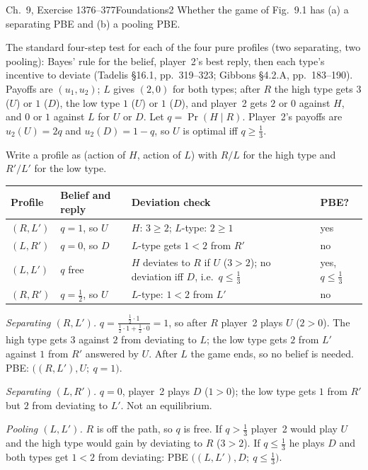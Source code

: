 \begin{exsol}{\MG{} Ch.~9, Exercise 1}{376--377}{Foundations}{2}
\asked Whether the game of Fig.~9.1 has (a) a separating PBE and (b) a pooling PBE.

\method The standard four-step test for each of the four pure profiles (two separating, two
pooling): Bayes' rule for the belief, player~2's best reply, then each type's incentive to deviate
(Tadelis \S16.1, pp.~319--323; Gibbons \S4.2.A, pp.~183--190). Payoffs are $(u_1, u_2)$; $L$ gives
$(2, 0)$ for both types; after $R$ the high type gets $3$ ($U$) or $1$ ($D$), the low type $1$
($U$) or $1$ ($D$), and player~2 gets $2$ or $0$ against $H$, and $0$ or $1$ against $L$ for
$U$ or $D$. Let $q = \Pr(H \mid R)$. Player~2's payoffs are $u_2(U) = 2q$ and $u_2(D) = 1 - q$,
so $U$ is optimal iff $q \ge \frac13$.

\solution Write a profile as (action of $H$, action of $L$) with $R/L$ for the high type and
$R'/L'$ for the low type.
\begin{center}
\small
\begin{tabular}{llp{6.4cm}l}
\toprule
Profile & Belief and reply & Deviation check & PBE? \\
\midrule
$(R, L')$ & $q = 1$, so $U$ & $H$: $3 \ge 2$; $L$-type: $2 \ge 1$ & yes \\
$(L, R')$ & $q = 0$, so $D$ & $L$-type gets $1 < 2$ from $R'$ & no \\
$(L, L')$ & $q$ free & $H$ deviates to $R$ if $U$ ($3 > 2$); no deviation iff $D$, i.e.\ $q \le \frac13$ & yes, $q \le \frac13$ \\
$(R, R')$ & $q = \frac12$, so $U$ & $L$-type: $1 < 2$ from $L'$ & no \\
\bottomrule
\end{tabular}
\end{center}
\emph{Separating $(R, L')$.} $q = \frac{\frac12 \cdot 1}{\frac12 \cdot 1 + \frac12 \cdot 0} = 1$,
so after $R$ player~2 plays $U$ ($2 > 0$). The high type gets $3$ against $2$ from deviating to $L$;
the low type gets $2$ from $L'$ against $1$ from $R'$ answered by $U$. After $L$ the game ends, so
no belief is needed. PBE: $\bigl((R, L'), U;\ q = 1\bigr)$.

\emph{Separating $(L, R')$.} $q = 0$, player~2 plays $D$ ($1 > 0$); the low type gets $1$ from
$R'$ but $2$ from deviating to $L'$. Not an equilibrium.

\emph{Pooling $(L, L')$.} $R$ is off the path, so $q$ is free. If $q > \frac13$ player~2 would play
$U$ and the high type would gain by deviating to $R$ ($3 > 2$). If $q \le \frac13$ he plays $D$ and
both types get $1 < 2$ from deviating: PBE $\bigl((L, L'), D;\ q \le \frac13\bigr)$.


\end{exsol}
